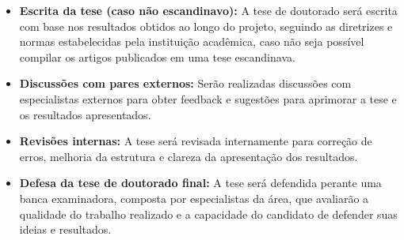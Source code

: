 \documentclass[12pt]{article}
\begin{document}
\begin{itemize}
\begin{itemize}
    \item \textbf{Escrita da tese (caso não escandinavo):} A tese de doutorado será escrita com base nos resultados obtidos ao longo do projeto, seguindo as diretrizes e normas estabelecidas pela instituição acadêmica, caso não seja possível compilar os artigos publicados em uma tese escandinava.
    
    \item \textbf{Discussões com pares externos:} Serão realizadas discussões com especialistas externos para obter feedback e sugestões para aprimorar a tese e os resultados apresentados.
    
    \item \textbf{Revisões internas:} A tese será revisada internamente para correção de erros, melhoria da estrutura e clareza da apresentação dos resultados.
    
    \item \textbf{Defesa da tese de doutorado final:} A tese será defendida perante uma banca examinadora, composta por especialistas da área, que avaliarão a qualidade do trabalho realizado e a capacidade do candidato de defender suas ideias e resultados.
\end{itemize}

\end{itemize}




\end{document}
